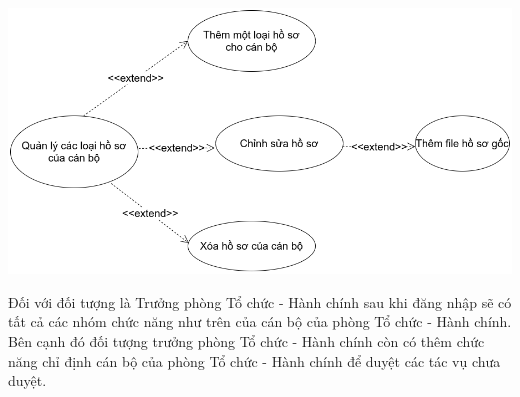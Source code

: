 \begin{center}
  \captionsetup{type=figure}
  \includegraphics[scale=0.5]{img/UML/TchcStaff/quanlyhoso.png}
\end{center}

Đối với đối tượng là Trưởng phòng Tổ chức - Hành chính sau khi đăng nhập sẽ có tất cả các nhóm chức năng như trên của cán bộ của phòng Tổ chức - Hành chính. Bên cạnh đó đối tượng trưởng phòng Tổ chức - Hành chính còn có thêm chức năng chỉ định cán bộ của phòng Tổ chức - Hành chính để duyệt các tác vụ chưa duyệt.

